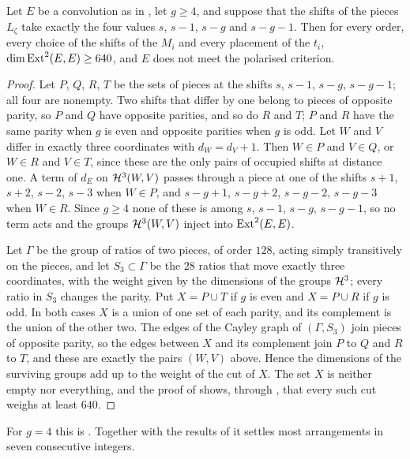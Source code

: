 \begin{proposition}\label{prop:efourpairsg}
Let $E$ be a convolution as in \cite[Lemma~18.36]{BMB26}, let $g\ge4$, and suppose that the shifts of the pieces $L_{\zeta}$ take exactly the four values $s$, $s-1$, $s-g$ and $s-g-1$. Then for every order, every choice of the shifts of the $M_{i}$ and every placement of the $t_{i}$, $\dim\mathrm{Ext}^{2}(E,E)\ge640$, and $E$ does not meet the polarised criterion.
\end{proposition}

\begin{proof}
Let $P$, $Q$, $R$, $T$ be the sets of pieces at the shifts $s$, $s-1$, $s-g$, $s-g-1$; all four are nonempty. Two shifts that differ by one belong to pieces of opposite parity, so $P$ and $Q$ have opposite parities, and so do $R$ and $T$; $P$ and $R$ have the same parity when $g$ is even and opposite parities when $g$ is odd. Let $W$ and $V$ differ in exactly three coordinates with $d_{W}=d_{V}+1$. Then $W\in P$ and $V\in Q$, or $W\in R$ and $V\in T$, since these are the only pairs of occupied shifts at distance one. A term of $d_{E}$ on $\mathcal{H}^{3}(W,V)$ passes through a piece at one of the shifts $s+1$, $s+2$, $s-2$, $s-3$ when $W\in P$, and $s-g+1$, $s-g+2$, $s-g-2$, $s-g-3$ when $W\in R$. Since $g\ge4$ none of these is among $s$, $s-1$, $s-g$, $s-g-1$, so no term acts and the groups $\mathcal{H}^{3}(W,V)$ inject into $\mathrm{Ext}^{2}(E,E)$.

Let $\Gamma$ be the group of ratios of two pieces, of order $128$, acting simply transitively on the pieces, and let $S_{3}\subset\Gamma$ be the $28$ ratios that move exactly three coordinates, with the weight given by the dimensions of the groups $\mathcal{H}^{3}$; every ratio in $S_{3}$ changes the parity. Put $X=P\cup T$ if $g$ is even and $X=P\cup R$ if $g$ is odd. In both cases $X$ is a union of one set of each parity, and its complement is the union of the other two. The edges of the Cayley graph of $(\Gamma,S_{3})$ join pieces of opposite parity, so the edges between $X$ and its complement join $P$ to $Q$ and $R$ to $T$, and these are exactly the pairs $(W,V)$ above. Hence the dimensions of the surviving groups add up to the weight of the cut of $X$. The set $X$ is neither empty nor everything, and the proof of \cite[Prop.~18.47]{BMB26} shows, through \cite[Lemma~18.40]{BMB26}, that every such cut weighs at least $640$.
\end{proof}

For $g=4$ this is \cite[Prop.~18.47]{BMB26}. Together with the results of \cite[\S18]{BMB26} it settles most arrangements in seven consecutive integers.

